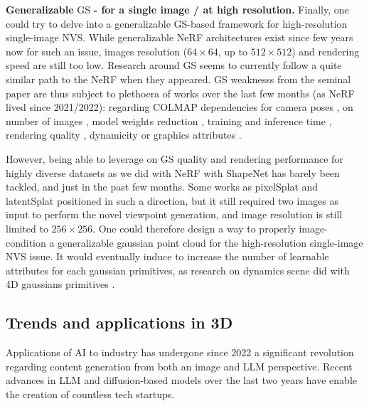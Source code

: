 %  
\noindent \textbf{Generalizable} \ac{GS} \textbf{- for a single image / at high resolution.}  Finally, one could try to delve into a generalizable \ac{GS}-based framework for high-resolution single-image \ac{NVS}. While generalizable \ac{NeRF} architectures exist since few years now \citep{yu2021pixelnerf,li2022symmnerf,lin2023vision} for such an issue, images resolution ($64\times 64$, up to $512\times 512$) and rendering speed are still too low. Research around \ac{GS} seems to currently follow a quite similar path to the \ac{NeRF} when they appeared. \ac{GS} weaknesss from the seminal paper \citep{kerbl20233d} are thus subject to plethoera of works over the last few months (as \ac{NeRF} lived since 2021/2022): regarding COLMAP dependencies for camera poses \citep{fu2023colmapfree}, on number of images \citep{xiong2023sparsegs,yang2024gaussianobject}, model weights reduction \citep{niedermayr2023compressed}, training and inference time \citep{fan2024instantsplat}, rendering quality \citep{yu2023mip} , dynamicity \citep{luiten2023dynamic} or graphics attributes \citep{wu2024deferredgs}.  

However, being able to leverage on \ac{GS} quality and rendering performance for highly diverse datasets as we did with NeRF \citep{landreau2024epinerf} with ShapeNet \citep{chang2015shapenet} has barely been tackled, and just in the past few months. Some works as pixelSplat \citep{charatan23pixelsplat} and latentSplat \citep{wewer24latentsplat} positioned in such a direction, but it still required two images as input to perform the novel viewpoint generation, and image resolution is still limited to $256\times 256$. One could therefore design a way to properly image-condition a generalizable gaussian point cloud for the high-resolution single-image \ac{NVS} issue. It would eventually induce to increase the number of learnable attributes for each gaussian primitives, as research on dynamics scene did with 4D gaussians primitives \citep{luiten2023dynamic,gao2024gaussianflow}.  


\subsection{Trends and applications in 3D}
Applications of \ac{AI} to industry has undergone since 2022 a significant revolution regarding content generation from both an image and \ac{LLM} perspective. Recent advances in \ac{LLM} and diffusion-based models over the last two years have enable the creation of countless tech startups. 

